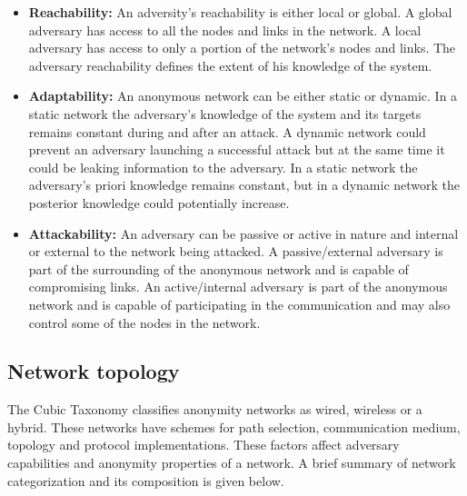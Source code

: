 \documentclass{llncs}
\begin{document}
\begin{itemize}
	\item[]{\textbf{Reachability:} An adversity's reachability is either local or global. A global adversary has access to all the nodes and links in the network. A local adversary has access to only a portion of the network's nodes and links. The adversary reachability defines the extent of his knowledge of the system.}
	\item[]{\textbf{Adaptability:} An anonymous network can be either static or dynamic. In a static network the adversary's knowledge of the system and its targets remains constant during and after an attack. A dynamic network could prevent an adversary launching a successful attack but at the same time it could be leaking information to the adversary. In a static network the adversary's priori knowledge remains constant, but in a dynamic network the posterior knowledge could potentially increase.}
	\item[]{\textbf{Attackability:} An adversary can be passive or active in nature and internal or external to the network being attacked. A passive/external adversary is part of the surrounding of the anonymous network and is capable of compromising links. An active/internal adversary is part of the anonymous network and is capable of participating in the communication and may also control some of the nodes in the network.}
\end{itemize}

\subsection{ Network topology}
The Cubic Taxonomy \cite{kelly2012exploring} classifies anonymity networks as wired, wireless or a hybrid. These networks have schemes for  path selection, communication medium, topology and protocol implementations. These factors affect adversary capabilities and anonymity properties of a network. A brief summary of network categorization and its composition is given below.
\end{document}
